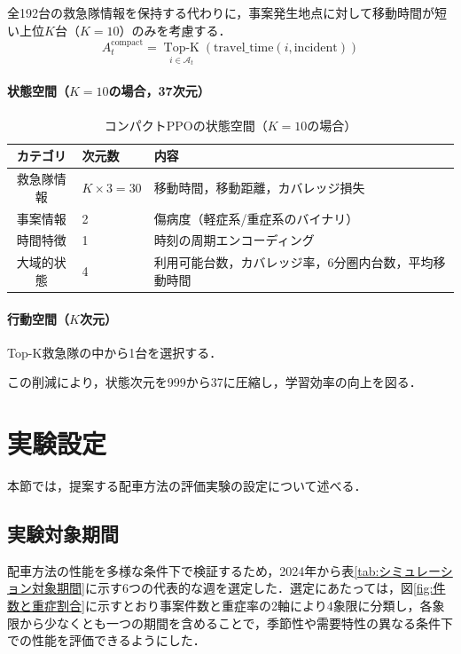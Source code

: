 全192台の救急隊情報を保持する代わりに，事案発生地点に対して移動時間が短い上位$K$台（$K=10$）のみを考慮する．
\[
A_t^{\text{compact}} = \underset{i \in \mathcal{A}_t}{\operatorname{Top-K}} \left( \text{travel\_time}(i, \text{incident}) \right)
\]

\paragraph{状態空間（$K=10$の場合，37次元）}

\begin{table}[H]
\centering
\caption{コンパクトPPOの状態空間（$K = 10$の場合）}
\label{tab:compact_state_space}
\begin{tabular}{cll}
\hline
カテゴリ & 次元数 & 内容 \\
\hline
救急隊情報 & $K \times 3 = 30$ & 移動時間，移動距離，カバレッジ損失 \\
事案情報 & 2 & 傷病度（軽症系/重症系のバイナリ） \\
時間特徴 & 1 & 時刻の周期エンコーディング \\
大域的状態 & 4 & 利用可能台数，カバレッジ率，6分圏内台数，平均移動時間 \\
\hline
\end{tabular}
\end{table}

\paragraph{行動空間（$K$次元）}

Top-K救急隊の中から1台を選択する．

この削減により，状態次元を999から37に圧縮し，学習効率の向上を図る．
\clearpage
\section{実験設定}
本節では，提案する配車方法の評価実験の設定について述べる．

\subsection{実験対象期間}
配車方法の性能を多様な条件下で検証するため，2024年から表\ref{tab:シミュレーション対象期間}に示す6つの代表的な週を選定した．選定にあたっては，図\ref{fig:件数と重症割合}に示すとおり事案件数と重症率の2軸により4象限に分類し，各象限から少なくとも一つの期間を含めることで，季節性や需要特性の異なる条件下での性能を評価できるようにした．

